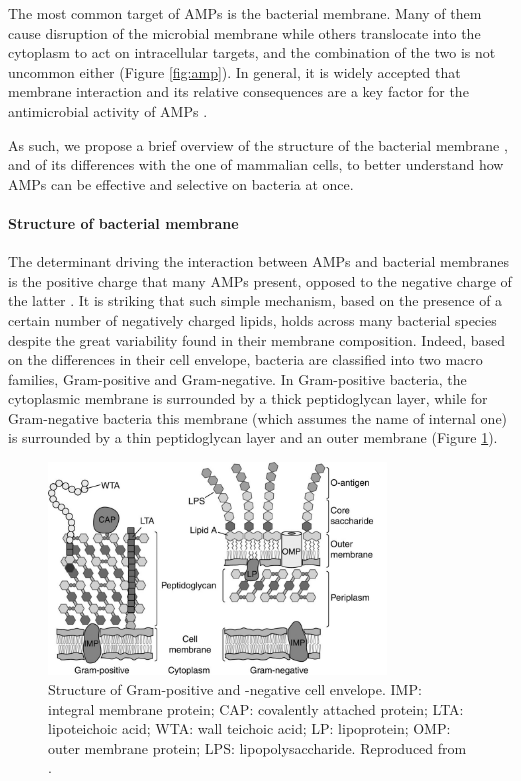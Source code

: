 The most common target of AMPs is the bacterial membrane. Many of them cause disruption of the microbial membrane while others translocate into the cytoplasm to act on intracellular targets, and the combination of the two is not uncommon either \citep{Hancock2006} (Figure \ref{fig:amp}). In general, it is widely accepted that membrane interaction and its relative consequences are a key factor for the antimicrobial activity of AMPs \citep{Nguyen2011}.

As such, we propose a brief overview of the structure of the bacterial membrane \citep{Silhavy2010}, and of its differences with the one of mammalian cells, to better understand how AMPs can be effective and selective on bacteria at once.


\paragraph{Structure of bacterial membrane}
The determinant driving the interaction between AMPs and bacterial membranes is the positive charge that many AMPs present, opposed to the negative charge of the latter \citep{Nguyen2011,Mahlapuu2016}.
%
It is striking that such simple mechanism, based on the presence of a certain number of negatively charged lipids, holds across many bacterial species despite the great variability found in their membrane composition.
%
Indeed, based on the differences in their cell envelope, bacteria are classified into two macro families, Gram-positive and Gram-negative.
%
In Gram-positive bacteria, the cytoplasmic membrane is surrounded by a thick peptidoglycan layer, while for Gram-negative bacteria this membrane (which assumes the name of internal one) is surrounded by a thin peptidoglycan layer and an outer membrane \citep{Silhavy2010,Lin2016} (Figure \ref{fig:membranes}).

\begin{figure}[t!]
\begin{center}
\includegraphics[width = 0.8\textwidth]{1introduction/pics/bacterial_membrane.jpg}
\caption[Structure of Gram-positive and Gram-negative cell envelope.]{Structure of Gram-positive and -negative cell envelope. IMP: integral membrane protein; CAP: covalently attached protein; LTA: lipoteichoic acid; WTA: wall teichoic acid; LP: lipoprotein; OMP: outer membrane protein; LPS: lipopolysaccharide. Reproduced from \citet{Silhavy2010}.} \label{fig:membranes}
\end{center}
\end{figure}

